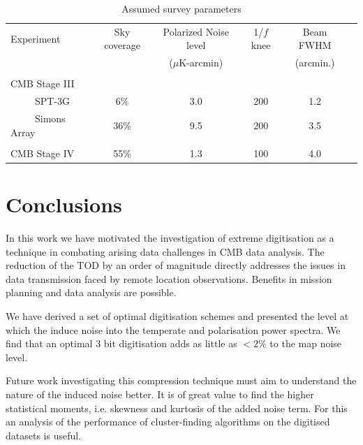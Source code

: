 \documentclass[apj]{emulateapj}
\begin{document}
\begin{table}[tbh]
\begin{center}
\caption{\label{tab:experiments} Assumed survey parameters}
\small
\begin{tabular}{l || c c c c c }
Experiment & Sky coverage & Polarized Noise level  & 1/$f$ knee & Beam FWHM \\
& &($\mu$K-arcmin)&&(arcmin.)\\
\hline
\tiny \\ \small
CMB Stage III & & & & \\
~~~~~SPT-3G & 6\% & 3.0 & 200 & 1.2 \\
~~~~~Simons Array & 36\% & 9.5 & 200 & 3.5 \\ 
\tiny \\ \small
CMB Stage IV & 55\% & 1.3 & 100 & 4.0 \\
\end{tabular}
 \normalsize
\end{center}
\end{table}

\section{Conclusions}
\label{sec:conclusions}

In this work we have motivated the investigation of extreme digitisation as a technique in combating arising data challenges in CMB data analysis. The reduction of the TOD by an order of magnitude directly addresses the issues in data transmission faced by remote location observations. Benefits in mission planning and data analysis are possible.

We have derived a set of optimal digitisation schemes and presented the level at which the induce noise into the temperate and polarisation power spectra. We find that an optimal 3 bit digitisation adds as little as $<2\%$ to the map noise level.

Future work investigating this compression technique must aim to understand the nature of the induced noise better. It is of great value to find the higher statistical moments, i.e. skewness and kurtosis of the added noise term. For this an analysis of the performance of cluster-finding algorithms on the digitised datasets is useful.
\end{document}
